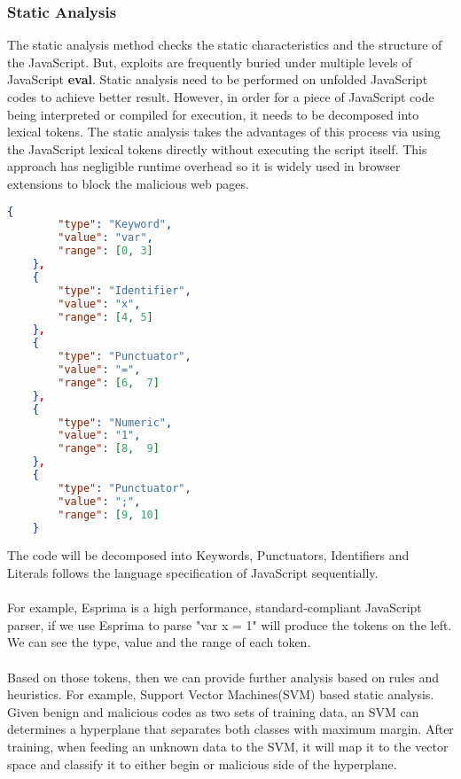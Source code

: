 \subsubsection{Static Analysis}
The static analysis method checks the static characteristics and the structure of the JavaScript. But, exploits are frequently buried under multiple levels of JavaScript \textbf{eval}. Static analysis need to be performed on unfolded JavaScript codes to achieve better result. However, in order for a piece of JavaScript code being interpreted or compiled for execution, it needs to be decomposed into lexical tokens. The static analysis takes the advantages of this process via using the JavaScript lexical tokens directly without executing the script itself. This approach has negligible runtime overhead so it is widely used in browser extensions to block the malicious web pages.
\begin{multicols}{2}
\begin{lstlisting}[language=json,title=(tokens from Esprima)]
    {
        "type": "Keyword",
        "value": "var",
        "range": [0, 3]
    },
    {
        "type": "Identifier",
        "value": "x",
        "range": [4, 5]
    },
    {
        "type": "Punctuator",
        "value": "=",
        "range": [6,  7]
    },
    {
        "type": "Numeric",
        "value": "1",
        "range": [8,  9]
    },
    {
        "type": "Punctuator",
        "value": ";",
        "range": [9, 10]
    }
	\end{lstlisting} 
The code will be decomposed into Keywords, Punctuators, Identifiers and Literals follows the language specification of JavaScript \cite{JavaScript} sequentially.  \\ \\
For example, Esprima\cite{Esprima} is a high performance, standard-compliant JavaScript parser, if we use Esprima to parse "var x = 1" will produce the tokens on the left. We can see the type, value and the range of each token.  \\ \\
Based on those tokens, then we can provide further analysis based on rules and heuristics. For example, Support Vector Machines(SVM) based static analysis. Given benign and malicious codes as two sets of training data, an SVM can determines a hyperplane that separates both classes with maximum margin. After training, when feeding an unknown data to the SVM, it will map it to the vector space and classify it to either begin or malicious side of the hyperplane.
\end{multicols} 
